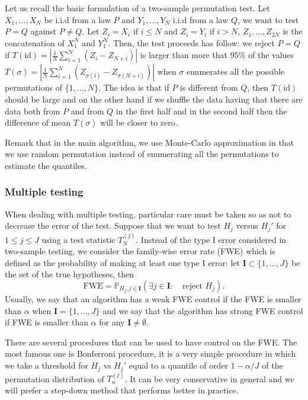 \documentclass{article}
\theoremstyle{plain}
\theoremstyle{remark}
\renewcommand{\P}{\mathbb{P}}
\newcommand{\1}{\mathbbm{1}}
\newcommand{\id}{\mathrm{id}}
\numberwithin{equation}{section}
\begin{document}
Let us recall the basic formulation of a two-sample permutation test. Let $X_1,\dots,X_N$ be i.i.d from a law $P$ and $Y_1,\dots,Y_N$ i.i.d from a law $Q$, we want to test $P=Q$ against $P \neq Q$. Let $Z_i = X_i$ if $i\le N$ and $Z_i = Y_i$ if $i>N$, $Z_1,\dots,Z_{2N}$ is the concatenation of $X_1^N$ and $Y_1^N$. Then, the test proceeds has follow: we reject $P=Q$ if $T(\id) = \left| \frac{1}{N}\sum_{i=1}^N(Z_i-Z_{N+i})\right|$ is larger than more that $95\%$ of the values $T(\sigma) =  \left| \frac{1}{N}\sum_{i=1}^N(Z_{\sigma(i)}-Z_{\sigma(N+i)})\right|$ when $\sigma$ enumerates all the possible permutations of $\{1,\dots,N\}$. The idea is that if $P$ is different from $Q$, then $T(\id)$ should be large and on the other hand if we shuffle the data having that there are data both from $P$ and from $Q$ in the first half and in the second half then the difference of mean $T(\sigma)$ will be closer to zero.

Remark that in the main algorithm, we use Monte-Carlo approximation in that we use random permutation instead of enumerating all the permutations to estimate the quantiles.

\subsubsection{Multiple testing}
When dealing with multiple testing, particular care must be taken so as not to decrease the error of the test. Suppose that we want to test $H_j$ versus $H_j'$ for $1\le j\le J$ using a test statistic $T_{N}^{(j)}$. Instead of the type I error considered in two-sample testing, we consider the family-wise error rate (FWE) which is defined as the probability of making at least one type I error: let $\textbf{I}\subset \{1,\dots,J\}$ be the set of the true hypotheses, then 
$$\mathrm{FWE} = \P_{H_j, j \in \textbf{I}}\left(\exists j \in \textbf{I}:\quad  \text{reject }H_j \right).$$
Usually, we say that an algorithm has a weak FWE control if the FWE is smaller than $\alpha$ when $\textbf{I}=\{1,\dots,J\}$ and we say that the algorithm has strong FWE control if FWE is smaller than $\alpha$ for any $\textbf{I}\neq \emptyset$.

There are several procedures that can be used to have control on the FWE. The most famous one is Bonferroni procedure, it is a very simple procedure in which we take a threshold for $H_j$ vs $H_j'$ equal to a quantile of order $1-\alpha/J$ of the permutation distribution of $T_n^{(j)}$. It can be very conservative in general and we will prefer a step-down method that performs better in practice.
\end{document}
